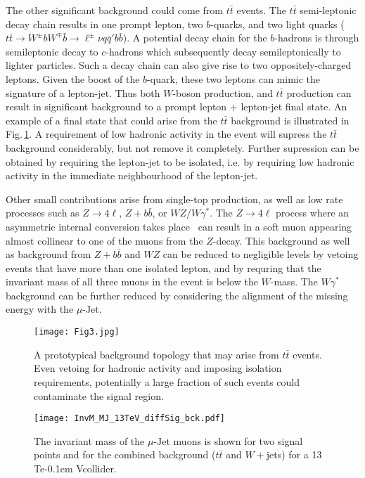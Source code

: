 \documentclass[reprint,doublecolumn,secnumarabic,amssymb, amsmath, aps,nofootinbib,superscriptaddress]{revtex4-1}
\newcommand{\Fig}[1]{Fig.\,\ref{#1}}
\def\TeV{\ifmmode {\mathrm{\ Te\kern -0.1em V}}\else
                   \textrm{Te\kern -0.1em V}\fi}%
\newcommand{\ttbar}{\ensuremath{t\bar{t}}}
\begin{document}
The other significant background could come from $\ttbar$ events. The $\ttbar$ semi-leptonic decay chain results in one prompt lepton, two $b$-quarks,
and two light quarks ($\ttbar\rightarrow W^\pm bW^\mp \bar{b}\rightarrow \ell^\pm \nu q\bar{q}' b\bar{b}$). A potential decay chain
for the $b$-hadrons is through semileptonic decay to $c$-hadrons which subsequently decay semileptonically to lighter particles. Such a decay chain can also give rise to two oppositely-charged leptons. Given the boost of the $b$-quark, these two leptons can mimic the signature of a lepton-jet.
Thus both $W$-boson production, and $\ttbar$ production can result in significant background to a prompt lepton $+$ lepton-jet final state. An example of a final state that could arise from the $\ttbar$ background is illustrated in \Fig{fig:tt_event}. A requirement of low hadronic activity in the event will supress the $\ttbar$ background considerably, but not remove it completely. Further supression can be obtained by requiring the lepton-jet to be isolated, i.e. by requiring
low hadronic activity in the immediate neighbourhood of the lepton-jet.


Other small contributions arise from single-top production, as well as low rate processes such as $Z\rightarrow 4\ell$, $Z+b\bar{b}$, or $WZ/W\gamma^*$. The $Z\rightarrow 4\ell$ process where an asymmetric internal conversion
takes place~\cite{Gray:2011us} can result in a soft muon appearing almost collinear to one of the muons from the $Z$-decay. This background as well as background from $Z+b\bar{b}$ and $WZ$ can be reduced to
negligible levels by vetoing events that have more than one isolated lepton, and by requring that the invariant mass of all three muons in the event is below the $W$-mass. The $W\gamma^*$
background can be further reduced by considering the alignment of the missing energy with the $\mu\text{-Jet}$.


\begin{figure}
  \centering
   \texttt{[image: Fig3.jpg]}
  \caption{A prototypical background topology that may arise from $t\bar{t}$ events. Even vetoing for hadronic activity and imposing isolation requirements, potentially a large fraction of such events could contaminate the signal region.}
  \label{fig:tt_event}
\end{figure}


\begin{figure}
  \centering
   \texttt{[image: InvM\_MJ\_13TeV\_diffSig\_bck.pdf]}
  \caption{The invariant mass of the $\mu\text{-Jet}$ muons is shown for two signal points and for the combined background ($\ttbar$ and $W+$jets) for a 13~\TeV collider. }
  \label{fig:invmass_mj}
\end{figure}
\end{document}
